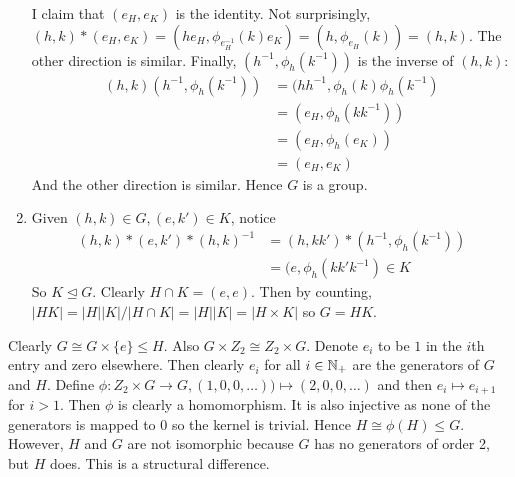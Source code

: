 \documentclass[12pt]{article}
\begin{document}
\begin{problem}[5]
\begin{enumerate}[label=(\alph*)]
		I claim that $ (e_H,e_K)$ is the identity. Not surprisingly, $ (h,k)*(e_H,e_K) = (he_H,\phi_{e_H^{-1}} (k) e_K  ) = (h, \phi_{e_H} (k) ) = (h,k)$. The other direction is similar. Finally, $ (h^{-1},\phi_h(k^{-1}))$ is the inverse of $ (h,k)$:
		\begin{align*}
			(h,k)(h^{-1},\phi_{h}(k^{-1})) &= (hh^{-1},\phi_{h}(k) \phi_h(k^{-1}) \\
			&= (e_H,\phi_h(k k ^{-1})) \\
			&= (e_H,\phi_h(e_K) )\\
			&= (e_H,e_K) 
		\end{align*}
		And the other direction is similar. Hence $ G$ is a group.
	\item Given $ (h,k) \in G,(e,k') \in K$, notice
		\begin{align*}
			(h,k)*(e,k')*(h,k)^{-1} &= (h,kk') * (h^{-1},\phi_h(k^{-1})) \\
			&= (e,\phi_h(kk'k^{-1}) \in K
		\end{align*}
		So $ K \trianglelefteq G$. Clearly $ H \cap K = (e,e)$. Then by counting, $ |HK| = |H||K| /|H \cap K| = |H||K| = |H \times K|$ so $ G = HK$.
\end{enumerate}
\end{problem}
\begin{problem}[6]
Clearly $ G \cong G \times \{e\} \leq H$. Also $ G \times Z_2 \cong Z_2 \times G$. Denote $ e_i$ to be $ 1$ in the  $ i$th entry and zero elsewhere. Then clearly $ e_i$ for all $ i \in \mathbb{N}_+$ are the generators of $ G$ and  $ H$. Define $ \phi:Z_2 \times G \to G, (1,0,0,\ldots)) \mapsto (2,0,0,\ldots)$ and then $ e_i \mapsto e_{i+1}$ for $ i >1$. Then $ \phi$ is clearly a homomorphism. It is also injective as none of the generators is mapped to 0 so the kernel is trivial. Hence  $ H \cong \phi(H) \leq G$. However, $ H$ and  $ G$ are not isomorphic because  $ G$ has no generators of order 2, but  $ H$ does. This is a structural difference.
\end{problem}
\end{document}

